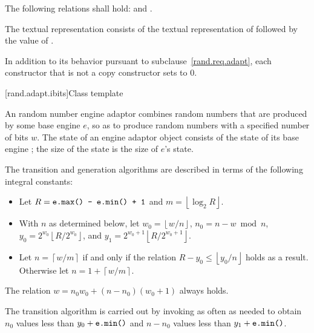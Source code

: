 \pnum
The following relations shall hold:
and
  .

\pnum
The textual representation
consists of
 the textual representation of 
followed by
 the value of .

\pnum
In addition to its behavior
pursuant to subclause~\ref{rand.req.adapt},
each constructor%
that is not a copy constructor
sets  to $0$.


[rand.adapt.ibits]{Class template }%
%

\pnum
An 
random number engine adaptor
combines random numbers
that are produced by some base engine $e$,
so as to produce random numbers
with a specified number of bits $w$.
The state 
of an 
engine adaptor object 
consists of
 the state  of its base engine ;
the size of the state is
 the size of $e$'s state.

\pnum
The transition and generation algorithms
are described in terms
of the following integral constants:%
\begin{itemize}
 \item
   Let
     $R = \tcode{e.max() - e.min() + 1}$
   and
     $m = \left\lfloor \log_2 R \right\rfloor$.
 \item
   With $n$ as determined below,
   let
     $w_0 = \left\lfloor w / n \right\rfloor$,
     $n_0 = n - w \bmod n$,
     $y_0 = 2^{w_0} \left\lfloor R / 2^{w_0} \right\rfloor$,
   and
     $y_1 = 2^{w_0 + 1} \left\lfloor R / 2^{w_0 + 1} \right\rfloor$.
 \item
   Let
     $n = \left\lceil w / m \right\rceil$
   if and only if the relation
     $R - y_0 \leq \left\lfloor y_0 / n \right\rfloor$
   holds as a result.
   Otherwise let
     $n = 1 + \left\lceil w / m \right\rceil$.
\end{itemize}
\begin{note}
 The relation
 $w = n_0 w_0 + (n - n_0)(w_0 + 1)$
 always holds.
\end{note}

\pnum
The transition algorithm
is carried out by invoking 
as often as needed to obtain $n_0$
values less than $y_0 + \tcode{e.min()}$
and $n - n_0$ values less than $y_1 + \tcode{e.min()}$.

